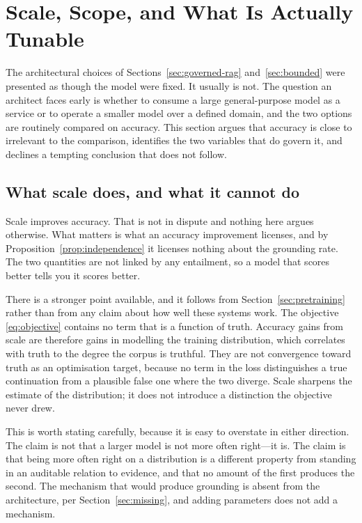 \section{Scale, Scope, and What Is Actually Tunable}
\label{sec:scale}

The architectural choices of Sections~\ref{sec:governed-rag} and~\ref{sec:bounded}
were presented as though the model were fixed. It usually is not. The question an
architect faces early is whether to consume a large general-purpose model as a
service or to operate a smaller model over a defined domain, and the two options are
routinely compared on accuracy. This section argues that accuracy is close to
irrelevant to the comparison, identifies the two variables that do govern it, and
declines a tempting conclusion that does not follow.

\subsection{What scale does, and what it cannot do}

Scale improves accuracy. That is not in dispute and nothing here argues otherwise.
What matters is what an accuracy improvement licenses, and by
Proposition~\ref{prop:independence} it licenses nothing about the grounding rate. The
two quantities are not linked by any entailment, so a model that
scores better tells you it scores better.

There is a stronger point available, and it follows from
Section~\ref{sec:pretraining} rather than from any claim about how well these systems
work. The objective \eqref{eq:objective} contains no term that is a function of
truth. Accuracy gains from scale are therefore gains in modelling the training
distribution, which correlates with truth to the degree the corpus is truthful. They
are not convergence toward truth as an optimisation target, because no term in the
loss distinguishes a true continuation from a plausible false one where the two
diverge. Scale sharpens the estimate of the distribution; it does not introduce a
distinction the objective never drew.

This is worth stating carefully, because it is easy to overstate in either
direction. The claim is not that a larger model is not more often right---it is. The
claim is that being more often right on a distribution is a different property from
standing in an auditable relation to evidence, and that no amount of the first
produces the second. The mechanism that would produce grounding is absent from the
architecture, per Section~\ref{sec:missing}, and adding parameters does not add a
mechanism.

